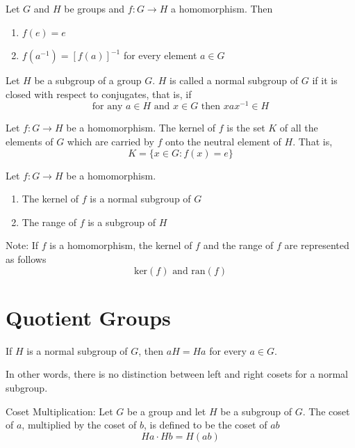 \documentclass[12pt]{article}
\newcommand{\inverse}[1]{#1 ^{-1}}
\newcommand{\set}[1]{\{ #1 \}}
\begin{document}
\begin{theorem} Let $G$ and $H$ be groups and $f: G \to H$ a homomorphism. Then \begin{enumerate} 
\item $f(e) = e$ 
\item $f(\inverse{a}) = [f(a)]^{-1}$ for every element $a \in G$ \end{enumerate} \end{theorem} 

\begin{definition} Let $H$ be a subgroup of a group $G$. $H$ is called a normal subgroup of $G$ if it is closed with respect to conjugates, that is, if $$ \text{for any } a \in H \text{ and } x \in G \text{ then } xa\inverse{x} \in H $$ \end{definition} 

\begin{definition} Let $f: G \to H$ be a homomorphism. The kernel of $f$ is the set $K$ of all the elements of $G$ which are carried by $f$ onto the neutral element of $H$. That is, $$ K = \set{x \in G: f(x) = e}$$ \end{definition} 

\begin{theorem} Let $f: G \to H$ be a homomorphism. \begin{enumerate} 
\item The kernel of $f$ is a normal subgroup of $G$
\item The range of $f$ is a subgroup of $H$ \end{enumerate} \end{theorem} 

Note: If $f$ is a homomorphism, the kernel of $f$ and the range of $f$ are represented as follows $$ \text{ker}(f) \text{  and  } \text{ran}(f) $$ 

\section{Quotient Groups}

\begin{theorem} If $H$ is a normal subgroup of $G$, then $aH = Ha$ for every $a \in G$. \end{theorem} 
In other words, there is no distinction between left and right cosets for a normal subgroup. 

\begin{definition} Coset Multiplication: Let $G$ be a group and let $H$ be a subgroup of $G$. The coset of $a$, multiplied by the coset of $b$, is defined to be the coset of $ab$ $$Ha \cdot Hb = H(ab)$$ \end{definition} 
\end{document}
